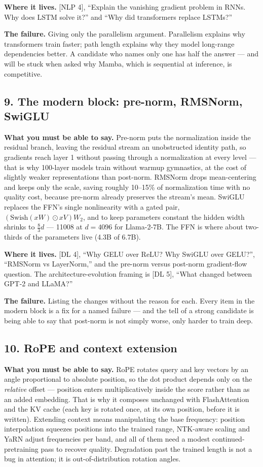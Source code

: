 \textbf{Where it lives.} [NLP 4], ``Explain the vanishing gradient problem in RNNs. Why does LSTM solve it?'' and ``Why did transformers replace LSTMs?''

\textbf{The failure.} Giving only the parallelism argument. Parallelism explains why transformers train faster; path length explains why they model long-range dependencies better. A candidate who names only one has half the answer --- and will be stuck when asked why Mamba, which is sequential at inference, is competitive.

\subsection*{9. The modern block: pre-norm, RMSNorm, SwiGLU}

\textbf{What you must be able to say.} Pre-norm puts the normalization inside the residual branch, leaving the residual stream an unobstructed identity path, so gradients reach layer 1 without passing through a normalization at every level --- that is why 100-layer models train without warmup gymnastics, at the cost of slightly weaker representations than post-norm. RMSNorm drops mean-centering and keeps only the scale, saving roughly 10--15\% of normalization time with no quality cost, because pre-norm already preserves the stream's mean. SwiGLU replaces the FFN's single nonlinearity with a gated pair, $(\mathrm{Swish}(xW) \odot xV)W_2$, and to keep parameters constant the hidden width shrinks to $\tfrac{8}{3}d$ --- 11008 at $d = 4096$ for Llama-2-7B. The FFN is where about two-thirds of the parameters live (4.3B of 6.7B).

\textbf{Where it lives.} [DL 4], ``Why GELU over ReLU? Why SwiGLU over GELU?'', ``RMSNorm vs LayerNorm,'' and the pre-norm versus post-norm gradient-flow question. The architecture-evolution framing is [DL 5], ``What changed between GPT-2 and LLaMA?''

\textbf{The failure.} Listing the changes without the reason for each. Every item in the modern block is a fix for a named failure --- and the tell of a strong candidate is being able to say that post-norm is not simply worse, only harder to train deep.

\subsection*{10. RoPE and context extension}

\textbf{What you must be able to say.} RoPE rotates query and key vectors by an angle proportional to absolute position, so the dot product depends only on the \emph{relative} offset --- position enters multiplicatively inside the score rather than as an added embedding. That is why it composes unchanged with FlashAttention and the KV cache (each key is rotated once, at its own position, before it is written). Extending context means manipulating the base frequency: position interpolation squeezes positions into the trained range, NTK-aware scaling and YaRN adjust frequencies per band, and all of them need a modest continued-pretraining pass to recover quality. Degradation past the trained length is not a bug in attention; it is out-of-distribution rotation angles.

